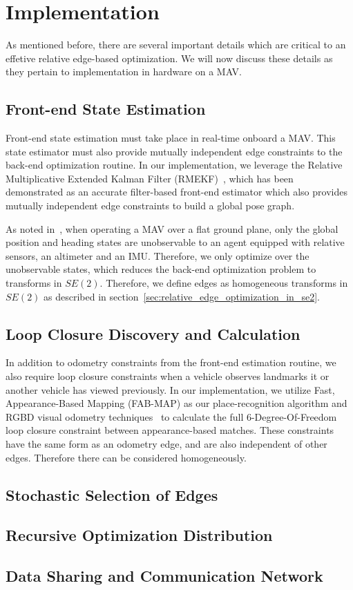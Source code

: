 
\section{Implementation}
As mentioned before, there are several important details which are critical to an effetive relative edge-based optimization.  We will now discuss these details as they pertain to implementation in hardware on a MAV.

\subsection{Front-end State Estimation}Front-end state estimation must take place in real-time onboard a MAV. This state estimator must also provide mutually independent edge constraints to the back-end optimization routine.  In our implementation, we leverage the Relative Multiplicative Extended Kalman Filter (RMEKF)~\cite{Koch2017}, which has been demonstrated as an accurate filter-based front-end estimator which also provides mutually independent edge constraints to build a global pose graph.

As noted in~\cite{Wheeler2017a}, when operating a MAV over a flat ground plane, only the global position and heading states are unobservable to an agent equipped with relative sensors, an altimeter and an IMU.  Therefore, we only optimize over the unobservable states, which reduces the back-end optimization problem to transforms in $SE(2)$.  Therefore, we define edges as homogeneous transforms in $SE(2)$ as described in section~\ref{sec:relative_edge_optimization_in_se2}.

\subsection{Loop Closure Discovery and Calculation}
In addition to odometry constraints from the front-end estimation routine, we also require loop closure constraints when a vehicle observes landmarks it or another vehicle has viewed previously.  In our implementation, we utilize Fast, Appearance-Based Mapping (FAB-MAP) as our place-recognition algorithm and RGBD visual odometry techniques~\cite{Leishman2013} to calculate the full 6-Degree-Of-Freedom loop closure constraint between appearance-based matches.  These constraints have the same form as an odometry edge, and are also independent of other edges.  Therefore there can be considered homogeneously.

\subsection{Stochastic Selection of Edges}

\subsection{Recursive Optimization Distribution}

\subsection{Data Sharing and Communication Network}
